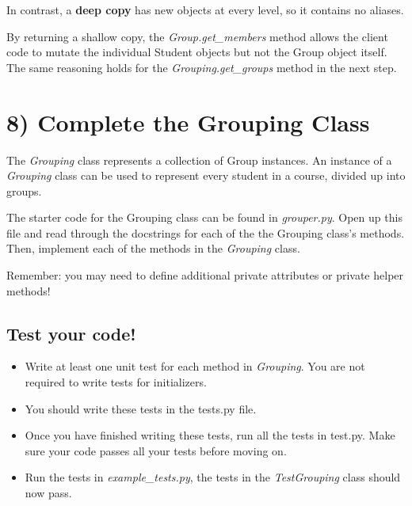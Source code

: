 \documentclass[12pt]{article}
\begin{document}
\bigskip

\noindent In contrast, a \textbf{deep copy} has new objects at every level, so
it contains no aliases.

\bigskip

By returning a shallow copy, the \textit{Group.get\_members} method allows the client code
to mutate the individual Student objects but not the Group object itself. The same
reasoning holds for the \textit{Grouping.get\_groups} method in the next step.

\section*{8) Complete the Grouping Class}
The \textit{Grouping} class represents a collection of Group instances. An
instance of a \textit{Grouping} class can be used to represent every student in a course,
divided up into groups.

\bigskip

\noindent  The starter code for the Grouping class can be found in \textit{grouper.py}. Open
up this file and read through the docstrings for each of the the Grouping class’s
methods. Then, implement each of the methods in the \textit{Grouping} class.

\bigskip

\noindent Remember: you may need to define additional private attributes or
private helper methods!

\bigskip

\subsection*{Test your code!}

\begin{itemize}
    \item Write at least one unit test for each method in \textit{Grouping}. You
    are not required to write tests for initializers.
    \item You should write these tests in the tests.py file.
    \item Once you have finished writing these tests, run all the tests in test.py. Make sure your code passes all your tests before moving on.
    \item Run the tests in \textit{example\_tests.py}, the tests in the \textit{TestGrouping} class
    should now pass.
\end{itemize}

\bigskip
\end{document}
